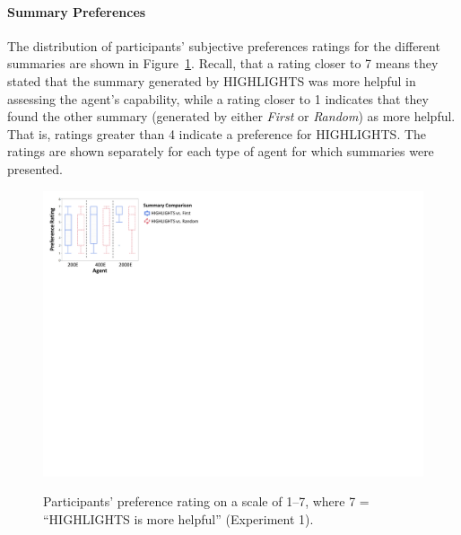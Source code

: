 \paragraph{Summary Preferences}
The distribution of participants' subjective preferences ratings for the different summaries are shown in Figure~\ref{fig:highlightsPrefs}. Recall, that a rating closer to 7 means they stated that the summary generated by HIGHLIGHTS was more helpful in assessing the agent's capability, while a rating closer to 1 indicates that they found the other summary (generated by either \emph{First} or \emph{Random}) as more helpful. That is, ratings greater than 4 indicate a preference for HIGHLIGHTS. The ratings are shown separately for each type of agent for which summaries were presented. 

\begin{figure}[h]
	\includegraphics[width=0.85\columnwidth]{figs/preferencesExp1figForPaper.pdf}\\
	\caption{Participants' preference rating on a scale of 1--7, where 7 = ``HIGHLIGHTS is more helpful'' (Experiment 1).}
	\label{fig:highlightsPrefs}
	\vspace{-0.3cm}
\end{figure}

